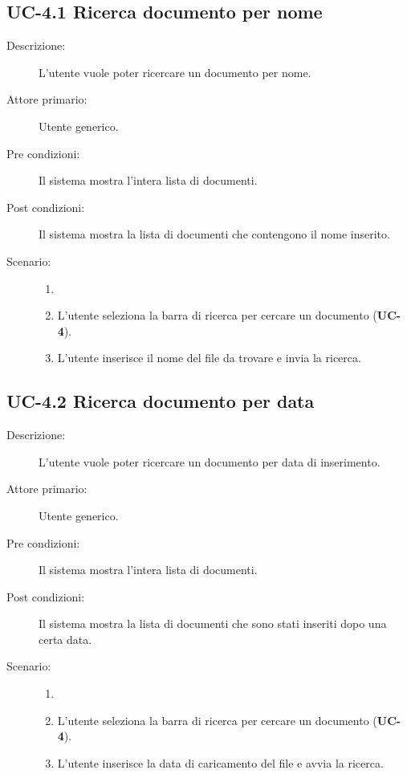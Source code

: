 \subsection{UC-4.1 Ricerca documento per nome}
\begin{description}
    \item[Descrizione:] L’utente vuole poter ricercare un documento per nome.
    \item[Attore primario:] Utente generico.
    \item[Pre condizioni:] Il sistema mostra l’intera lista di documenti.
    \item[Post condizioni:] Il sistema mostra la lista di documenti che contengono il nome inserito.
    \item[Scenario:] 
    \begin{enumerate}
        \item[]
        \item L’utente seleziona la barra di ricerca per cercare un documento (\textbf{UC-4}).
        \item L’utente inserisce il nome del file da trovare e invia la ricerca.
    \end{enumerate}
\end{description}

\subsection{UC-4.2 Ricerca documento per data}
\begin{description}
    \item[Descrizione:] L’utente vuole poter ricercare un documento per data di inserimento.
    \item[Attore primario:] Utente generico.
    \item[Pre condizioni:] Il sistema mostra l’intera lista di documenti.
    \item[Post condizioni:] Il sistema mostra la lista di documenti che sono stati inseriti dopo una certa data.
    \item[Scenario:] 
    \begin{enumerate}
        \item[]
        \item L’utente seleziona la barra di ricerca per cercare un documento (\textbf{UC-4}).
        \item L’utente inserisce la data di caricamento del file e avvia la ricerca.
    \end{enumerate}
\end{description}

